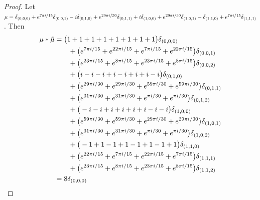  
\begin{proof}
Let  $\mu =  \delta_{(0,0,0)}+e^{7\pi i/15}\delta_{(0,0,1)}-i\delta_{(0,1,0)}+e^{29\pi i/30}\delta_{(0,1,1)}+i\delta_{(1,0,0)}+e^{29\pi i/30}\delta_{(1,0,1)}-\delta_{(1,1,0)}+e^{7\pi i/15}\delta_{(1,1,1)}
$.  Then 
\begin{align*} 
\mu * \tilde \mu & = \big(1+1+1+1+1+1+1+1\big)\delta_{(0,0,0)}
\\&\qquad
+\big(e^{7\pi i/15}+e^{22\pi i/15}+e^{7\pi i/15}+e^{22\pi i/15}\big)\delta_{(0,0,1)}
\\&\qquad
+\big(e^{23\pi i/15}+e^{8\pi i/15}+e^{23\pi i/15}+e^{8\pi i/15}\big)\delta_{(0,0,2)}
\\&\qquad
+\big(i-i-i+i-i+i+i-i\big)\delta_{(0,1,0)}
\\&\qquad
+\big(e^{29\pi i/30}+e^{29\pi i/30}+e^{59\pi i/30}+e^{59\pi i/30}\big)\delta_{(0,1,1)}
\\&\qquad
+\big(e^{31\pi i/30}+e^{31\pi i/30}+e^{\pi i/30}+e^{\pi i/30}\big)\delta_{(0,1,2)}
\\&\qquad
+\big(-i-i+i+i+i+i-i-i\big)\delta_{(1,0,0)}
\\&\qquad
+\big(e^{59\pi i/30}+e^{59\pi i/30}+e^{29\pi i/30}+e^{29\pi i/30}\big)\delta_{(1,0,1)}
\\&\qquad
+\big(e^{31\pi i/30}+e^{31\pi i/30}+e^{\pi i/30}+e^{\pi i/30}\big)\delta_{(1,0,2)}
\\&\qquad
+\big(-1+1-1+1-1+1-1+1\big)\delta_{(1,1,0)}
\\&\qquad
+\big(e^{22\pi i/15}+e^{7\pi i/15}+e^{22\pi i/15}+e^{7\pi i/15}\big)\delta_{(1,1,1)}
\\&\qquad
+\big(e^{23\pi i/15}+e^{8\pi i/15}+e^{23\pi i/15}+e^{8\pi i/15}\big)\delta_{(1,1,2)}\\&=8\delta_{(0 , 0, 0)}\qedhere
\end{align*}
\end{proof}

